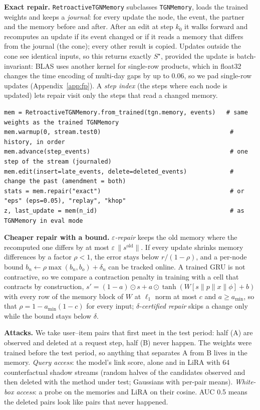 \documentclass{article}
\begin{document}
\textbf{Exact repair.} \texttt{RetroactiveTGNMemory} subclasses \texttt{TGNMemory}, loads the trained weights and keeps a
\emph{journal}: for every update the node, the event, the partner and the memory before and after. After an edit at step
$k_0$ it walks forward and recomputes an update if its event changed or if it reads a memory that differs from the journal
(the cone); every other result is copied. Updates outside the cone see identical inputs, so this returns exactly
$S^\star$, provided the update is batch-invariant: BLAS uses another kernel for single-row products, which in float32
changes the time encoding of multi-day gaps by up to 0.06, so we pad single-row updates (Appendix~\ref{app:fp}). A
\emph{step index} (the steps where each node is updated) lets repair visit only the steps that read a changed memory.
\begin{lstlisting}
mem = RetroactiveTGNMemory.from_trained(tgn.memory, events)   # same weights as the trained TGNMemory
mem.warmup(0, stream.test0)                                    # history, in order
mem.advance(step_events)                                       # one step of the stream (journaled)
mem.edit(insert=late_events, delete=deleted_events)            # change the past (amendment = both)
stats = mem.repair("exact")                                    # or "eps" (eps=0.05), "replay", "khop"
z, last_update = mem(n_id)                                     # as TGNMemory in eval mode
\end{lstlisting}

\textbf{Cheaper repair with a bound.} \emph{$\varepsilon$-repair} keeps the old memory where the recomputed one differs by at
most $\varepsilon\,\|s^{\text{old}}\|$. If every update shrinks memory differences by a factor $\rho<1$, the error stays below
$r/(1-\rho)$, and a per-node bound $b_n\leftarrow\rho\max(b_n,b_o)+\delta_n$ can be tracked online. A trained GRU is not
contractive, so we compare a contraction penalty in training with a cell that contracts by construction,
$s'=(1-a)\odot s+a\odot\tanh(W[s\|p\|x\|\phi]+b)$ with every row of the memory block of $W$ at $\ell_1$ norm at most $c$ and
$a\ge a_{\min}$, so that $\rho=1-a_{\min}(1-c)$ for every input; \emph{$\delta$-certified repair} skips a change only while the
bound stays below $\delta$.

\textbf{Attacks.} We take user--item pairs that first meet in the test period: half (A) are observed and deleted at a request
step, half (B) never happen. The weights were trained before the test period, so anything that separates A from B lives in
the memory. \emph{Query access}: the model's link score, alone and in LiRA with 64 counterfactual shadow streams (random
halves of the candidates observed and then deleted with the method under test; Gaussians with per-pair means). \emph{White-box
access}: a probe on the memories and LiRA on their cosine. AUC 0.5 means the deleted pairs look like pairs that never
happened.
\end{document}
